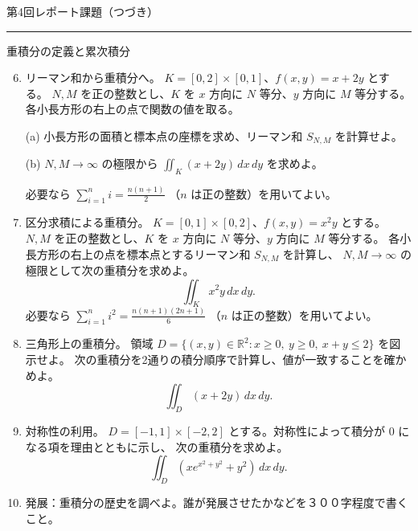 \documentclass[a4paper,10pt,pdflatex,ja=standard,jafont=ipaex-type1,
  magstyle=real,scale=1]{bxjsarticle}
\newcommand{\handouttitle}[1]{%
  \begin{center}
    {\Large\mdseries\color{ink}#1}\par\vspace{3mm}
    {\color{accent}\rule{0.88\linewidth}{0.7pt}}
  \end{center}\vspace{-2mm}}
\newcommand{\topic}[1]{\par\vspace{5pt}%
  {\large\sffamily\mdseries\color{accent}#1}\par\vspace{2pt}}
\newenvironment{problems}
  {\begin{enumerate}[leftmargin=2.4em,itemsep=3pt,topsep=3pt,parsep=0pt,
    font=\color{accent}]}
  {\end{enumerate}}
\newcommand{\problemlabel}[1]{{\sffamily\mdseries\color{ink}#1}}
\newcommand{\problemspace}[1][14mm]{\par\vspace{#1}}
\begin{document}
\newpage
\handouttitle{第4回\quad レポート課題（つづき）}
\topic{重積分の定義と累次積分}
\begin{problems}
\setcounter{enumi}{5}
\item \problemlabel{リーマン和から重積分へ。}
$K=[0,2]\times[0,1]$、$f(x,y)=x+2y$ とする。
$N,M$ を正の整数とし、$K$ を $x$ 方向に $N$ 等分、$y$ 方向に $M$ 等分する。
各小長方形の右上の点で関数の値を取る。
\par (a) 小長方形の面積と標本点の座標を求め、リーマン和 $S_{N,M}$ を計算せよ。
\par (b) $N,M\to\infty$ の極限から $\displaystyle\iint_K(x+2y)\,dx\,dy$ を求めよ。
\par {\small\color{muted}必要なら $\displaystyle\sum_{i=1}^n i=\frac{n(n+1)}2$
（$n$ は正の整数）を用いてよい。}
\problemspace[12mm]

\item \problemlabel{区分求積による重積分。}
$K=[0,1]\times[0,2]$、$f(x,y)=x^2y$ とする。
$N,M$ を正の整数とし、$K$ を $x$ 方向に $N$ 等分、$y$ 方向に $M$ 等分する。
各小長方形の右上の点を標本点とするリーマン和 $S_{N,M}$ を計算し、
$N,M\to\infty$ の極限として次の重積分を求めよ。
$$
 \iint_K x^2y\,dx\,dy.
$$
{\small\color{muted}必要なら $\displaystyle\sum_{i=1}^n i^2=\frac{n(n+1)(2n+1)}6$
（$n$ は正の整数）を用いてよい。}
\problemspace[12mm]

\item \problemlabel{三角形上の重積分。}
領域 $D=\{(x,y)\in\mathbb R^2:x\ge0,\ y\ge0,\ x+y\le2\}$ を図示せよ。
次の重積分を2通りの積分順序で計算し、値が一致することを確かめよ。
$$
 \iint_D(x+2y)\,dx\,dy.
$$
\problemspace[12mm]

\item \problemlabel{対称性の利用。}
$D=[-1,1]\times[-2,2]$ とする。対称性によって積分が $0$ になる項を理由とともに示し、
次の重積分を求めよ。
$$
 \iint_D\left(xe^{x^2+y^2}+y^2\right)\,dx\,dy.
$$
\problemspace[12mm]

\item \problemlabel{発展：}重積分の歴史を調べよ。誰が発展させたかなどを３００字程度で書くこと。
\problemspace[12mm]
\end{problems}
\end{document}

